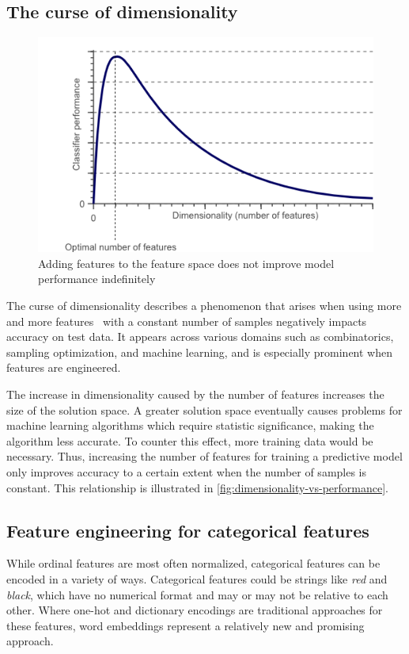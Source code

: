 \subsection{The curse of dimensionality}\label{sec:background:curse-of-dimensionality}
\begin{figure}
    \centering
    \includegraphics[width=.75\textwidth]{gfx/dimensionality_vs_performance.png}
    \caption[A visualization of the curse of dimensionality]{Adding features to the feature space does not improve model performance indefinitely}
    \label{fig:dimensionality-vs-performance}
\end{figure}
The curse of dimensionality describes a phenomenon that arises when using more and more features~\cite{Aalst2016} with a constant number of samples negatively impacts accuracy on test data. It appears across various domains such as combinatorics, sampling optimization, and machine learning, and is especially prominent when features are engineered.

The increase in dimensionality caused by the number of features increases the size of the solution space. A greater solution space eventually causes problems for machine learning algorithms which require statistic significance, making the algorithm less accurate. To counter this effect, more training data would be necessary. Thus, increasing the number of features for training a predictive model only improves accuracy to a certain extent when the number of samples is constant. This relationship is illustrated in \autoref{fig:dimensionality-vs-performance}.

\subsection{Feature engineering for categorical features}\label{sec:categorical-feature-engineering}
While ordinal features are most often normalized, categorical features can be encoded in a variety of ways. Categorical features could be strings like \textit{red} and \textit{black}, which have no numerical format and may or may not be relative to each other. Where one-hot and dictionary encodings are traditional approaches for these features, word embeddings represent a relatively new and promising approach.

